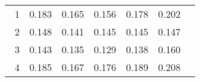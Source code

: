 \documentclass[8]{report}
\begin{document}
\begin{table}[ht]
\begin{threeparttable}
\begin{tabular}{l*{6}{c}}
\hline


\    1  &     0.183  &   0.165   &   0.156  &  0.178  &  0.202   \\
                       

\       2&      0.148 &   0.141 &   0.145  &   0.145  &  0.147             \\
                  
\       3&     0.143   &  0.135  &  0.129  &  0.138   & 0.160       \\
     
 \       4  &   0.185  &    0.167  &   0.176 & 0.189   & 0.208           \\
 

\hline 

\end{tabular}



\end{threeparttable}









\end{table}
\end{document}
